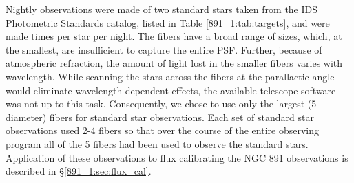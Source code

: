 Nightly observations were made of two standard stars taken from the
IDS Photometric Standards catalog, listed in Table \ref{891_1:tab:targets},
and were made  times per star per night. The \GP fibers have a
broad range of sizes, which, at the smallest, are insufficient to
capture the entire PSF. Further, because of atmospheric refraction,
the amount of light lost in the smaller fibers varies with wavelength.
While scanning the stars across the fibers at the parallactic angle
would eliminate wavelength-dependent effects, the available telescope
software was not up to this task. Consequently, we chose to use only
the largest (5 diameter) fibers for standard star
observations. Each set of standard star observations used 2-4 fibers
so that over the course of the entire observing program all of the
5 fibers had been used to observe the standard
stars. Application of these observations to flux calibrating the NGC
891 observations is described in \S\ref{891_1:sec:flux_cal}.




